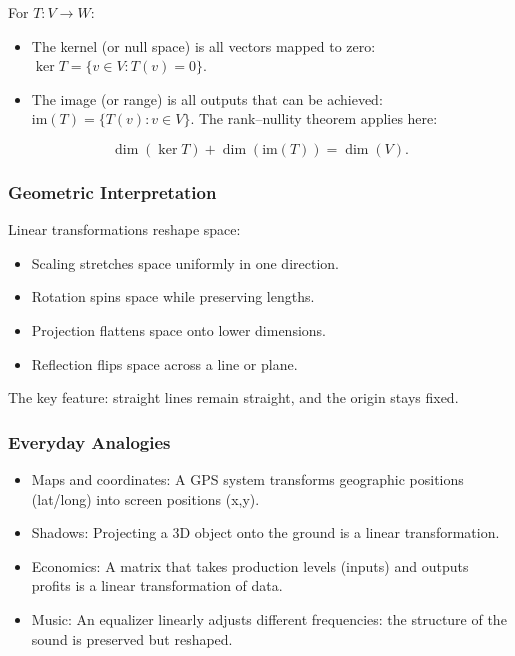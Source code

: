 \documentclass[
  letterpaper,
  DIV=11,
  numbers=noendperiod]{scrreprt}
\providecommand{\tightlist}{%
  \setlength{\itemsep}{0pt}\setlength{\parskip}{0pt}}
\begin{document}
For \(T: V \to W\):

\begin{itemize}
\tightlist
\item
  The kernel (or null space) is all vectors mapped to zero:
  \(\ker T = \{v \in V : T(v) = 0\}\).
\item
  The image (or range) is all outputs that can be achieved:
  \(\text{im}(T) = \{T(v) : v \in V\}\). The rank--nullity theorem
  applies here:
\end{itemize}

\[
\dim(\ker T) + \dim(\text{im}(T)) = \dim(V).
\]

\subsubsection{Geometric
Interpretation}\label{geometric-interpretation-7}

Linear transformations reshape space:

\begin{itemize}
\tightlist
\item
  Scaling stretches space uniformly in one direction.
\item
  Rotation spins space while preserving lengths.
\item
  Projection flattens space onto lower dimensions.
\item
  Reflection flips space across a line or plane.
\end{itemize}

The key feature: straight lines remain straight, and the origin stays
fixed.

\subsubsection{Everyday Analogies}\label{everyday-analogies-37}

\begin{itemize}
\tightlist
\item
  Maps and coordinates: A GPS system transforms geographic positions
  (lat/long) into screen positions (x,y).
\item
  Shadows: Projecting a 3D object onto the ground is a linear
  transformation.
\item
  Economics: A matrix that takes production levels (inputs) and outputs
  profits is a linear transformation of data.
\item
  Music: An equalizer linearly adjusts different frequencies: the
  structure of the sound is preserved but reshaped.
\end{itemize}
\end{document}
